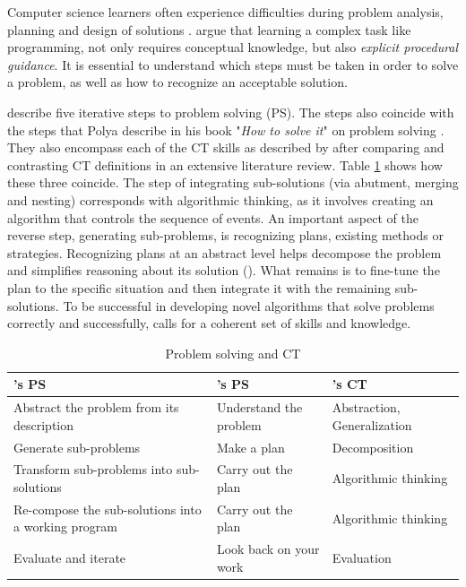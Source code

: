 Computer science learners often experience difficulties during problem analysis, planning and design of solutions \cite{Hazzan2011}.  argue that learning a complex task like programming, not only requires conceptual knowledge, but also \emph{explicit procedural guidance}. It is essential to understand which steps must be taken in order to solve a problem, as well as how to recognize an acceptable solution.


 describe five iterative steps to problem solving (PS). The steps also coincide with the steps that Polya describe in his book "\emph{How to solve it}" on problem solving \cite{polya2004solve}. They also encompass each of the CT skills as described by  after comparing and contrasting CT definitions in an extensive literature review.  Table \ref{table:problemSolvingCT} shows how these three coincide. The step of integrating sub-solutions (via abutment, merging and nesting) corresponds with algorithmic thinking, as it involves creating an algorithm that controls the sequence of events. An important aspect of the reverse step, generating sub-problems, is recognizing plans, existing methods or strategies. Recognizing plans at an abstract level helps decompose the problem and simplifies reasoning about its solution (\cite{Smetsers2017}). What remains is to fine-tune the plan to the specific situation and then integrate it with the remaining sub-solutions. To be successful in developing novel algorithms that solve problems correctly and successfully, calls for a coherent set of skills and knowledge.



\begin{table}
  \centering
\begin{tabular}{|l|l|l|}
  \hline
  \textbf{\citeauthor{McCracken2001}'s PS} & \textbf{\citeauthor{polya2004solve}'s PS} & \textbf{\cite{selby2013computational}'s CT} \\
  \hline


    Abstract the problem from its description & Understand the problem & Abstraction, Generalization \\ \hline

    Generate sub-problems & Make a plan & Decomposition \\ \hline

    Transform sub-problems into sub-solutions & Carry out the plan & Algorithmic thinking \\ \hline

    Re-compose the sub-solutions into a working program & Carry out the plan & Algorithmic thinking \\ \hline

    Evaluate and iterate & Look back on your work & Evaluation \\ \hline

  \hline
\end{tabular}
\caption{Problem solving and CT}\label{table:problemSolvingCT}
\end{table}





